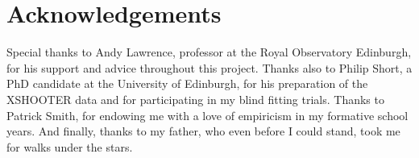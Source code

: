 \documentclass[a4paper,11pt]{article}
\begin{document}
\section{Acknowledgements}\label{sec:acknowledgements}

Special thanks to Andy Lawrence, professor at the Royal Observatory Edinburgh, for his support and advice throughout this project. Thanks also to Philip Short, a PhD candidate at the University of Edinburgh, for his preparation of the XSHOOTER data and for participating in my blind fitting trials. Thanks to Patrick Smith, for endowing me with a love of empiricism in my formative school years. And finally, thanks to my father, who even before I could stand, took me for walks under the stars.

\printbibliography

%
%
%
\end{document}

